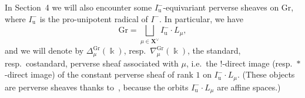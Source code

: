 In Section~4 we will also encounter some $I^-_\mathrm{u}$-equivariant perverse sheaves on $\mathrm{Gr}$, where $I^-_\mathrm{u}$ is the pro-unipotent radical of $I^-$. In particular, we have
\[
\mathrm{Gr} = \mathop{\textstyle\bigsqcup}\limits_{\mu \in \boldsymbol{X}^\vee} I_\mathrm{u}^- \cdot L_\mu,
\]
and we will denote by $\Delta^\mathrm{Gr}_\mu(\Bbbk)$, resp.~$\nabla^\mathrm{Gr}_\mu(\Bbbk)$, the standard, resp.~costandard, perverse sheaf associated with $\mu$, i.e.~the $!$-direct image (resp.~$*$-direct image) of the constant perverse sheaf of rank $1$ on $I^-_\mathrm{u} \cdot L_\mu$. (These objects are perverse sheaves thanks to~\cite[Cor.~4.1.3]{jep104ref12}, because the orbits $I^-_\mathrm{u}\cdot L_\mu$ are affine spaces.)

